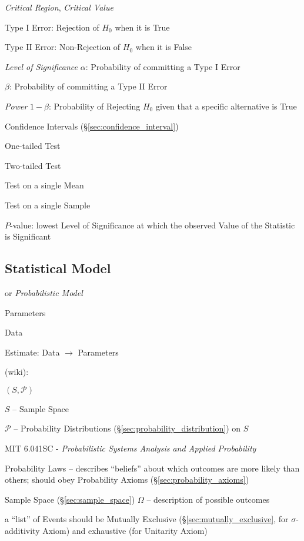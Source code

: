 \emph{Critical Region}, \emph{Critical Value}

Type I Error: Rejection of $H_0$ when it is True

Type II Error: Non-Rejection of $H_0$ when it is False

\emph{Level of Significance} $\alpha$: Probability of committing a
Type I Error

$\beta$: Probability of committing a Type II Error

\emph{Power} $1 - \beta$: Probability of Rejecting $H_0$ given that a
specific alternative is True

Confidence Intervals (\S\ref{sec:confidence_interval})

One-tailed Test

Two-tailed Test

Test on a single Mean

Test on a single Sample

$P$-value: lowest Level of Significance at which the observed Value of
the Statistic is Significant



\subsection{Statistical Model}\label{sec:statistical_model}

or \emph{Probabilistic Model}

Parameters

Data

Estimate: Data $\rightarrow$ Parameters

(wiki):

$(S, \mathcal{P})$

$S$ -- Sample Space

$\mathcal{P}$ -- Probability Distributions
(\S\ref{sec:probability_distribution}) on $S$

\asterism

MIT 6.041SC - \emph{Probabilistic Systems Analysis and Applied Probability}

Probability Laws -- describes ``beliefs'' about which outcomes are more likely
than others; should obey Probability Axioms (\S\ref{sec:probability_axioms})

Sample Space (\S\ref{sec:sample_space}) $\Omega$ -- description of possible
outcomes

a ``list'' of Events should be Mutually Exclusive
(\S\ref{sec:mutually_exclusive}, for $\sigma$-additivity Axiom) and exhaustive
(for Unitarity Axiom)

